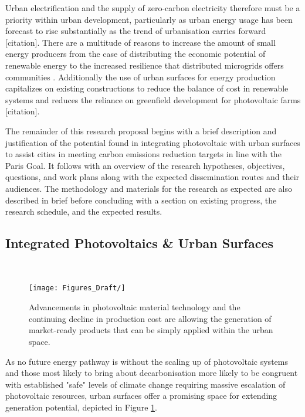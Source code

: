 Urban electrification and the supply of zero-carbon electricity therefore must be a priority within urban development, particularly as urban energy usage has been forecast to rise substantially as the trend of urbanisation carries forward [citation]. There are a multitude of reasons to increase the amount of small energy producers from the case of distributing the economic potential of renewable energy to the increased resilience that distributed microgrids offers communities \cite{klagge_decentralized_2012, hussain_microgrids_2019,  perera_electrical_2017, perera_quantifying_2020}. Additionally the use of urban surfaces for energy production capitalizes on existing constructions to reduce the balance of cost in renewable systems and reduces the reliance on greenfield development for photovoltaic farms [citation]. 

The remainder of this research proposal begins with a brief description and justification of the potential found in integrating photovoltaic with urban surfaces to assist cities in meeting carbon emissions reduction targets in line with the Paris Goal. It follows with an overview of the research hypotheses, objectives, questions, and work plans along with the expected dissemination routes and their audiences. The methodology and materials for the research as expected are also described in brief before concluding with a section on existing progress, the research schedule, and the expected results.

\subsection{Integrated Photovoltaics \& Urban Surfaces}\

\begin{figure}[b]
    \centering
    \texttt{[image: Figures\_Draft/]}
    \caption{Advancements in photovoltaic material technology and the continuing decline in production cost are allowing the generation of market-ready products that can be simply applied within the urban space.}
    \label{fig:urbansurfaces}
\end{figure}

As no future energy pathway is without the scaling up of photovoltaic systems and those most likely to bring about decarbonisation more likely to be congruent with established "safe" levels of climate change requiring massive escalation of photovoltaic resources, urban surfaces offer a promising space for extending generation potential, depicted in Figure \ref{fig:urbansurfaces}. 

